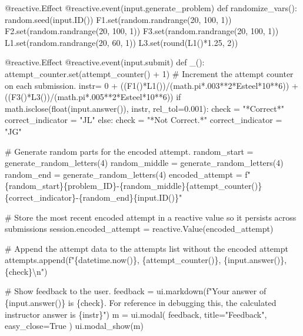 \documentclass[
  letterpaper,
  DIV=11,
  numbers=noendperiod]{scrreprt}
\newenvironment{Shaded}{\begin{snugshade}}{\end{snugshade}}
\newcommand{\NormalTok}[1]{\textcolor[rgb]{0.00,0.23,0.31}{#1}}
\begin{document}
\begin{Shaded}
\begin{Highlighting}[]
\NormalTok{    @reactive.Effect}
\NormalTok{    @reactive.event(input.generate\_problem)}
\NormalTok{    def randomize\_vars():}
\NormalTok{        random.seed(input.ID())}
\NormalTok{        F1.set(random.randrange(20, 100, 1))}
\NormalTok{        F2.set(random.randrange(20, 100, 1))}
\NormalTok{        F3.set(random.randrange(20, 100, 1))}
\NormalTok{        L1.set(random.randrange(20, 60, 1))}
\NormalTok{        L3.set(round(L1()*1.25, 2))}
        
        

\NormalTok{    @reactive.Effect}
\NormalTok{    @reactive.event(input.submit)}
\NormalTok{    def \_():}
\NormalTok{        attempt\_counter.set(attempt\_counter() + 1)  \# Increment the attempt counter on each submission.}
\NormalTok{        instr= 0 + ((F1()*L1())/(math.pi*.003**2*Esteel*10**6)) + ((F3()*L3())/(math.pi*.005**2*Esteel*10**6))}
\NormalTok{        if math.isclose(float(input.answer()), instr, rel\_tol=0.001):}
\NormalTok{            check = "*Correct*"}
\NormalTok{            correct\_indicator = "JL"}
\NormalTok{        else:}
\NormalTok{            check = "*Not Correct.*"}
\NormalTok{            correct\_indicator = "JG"}

\NormalTok{        \# Generate random parts for the encoded attempt.}
\NormalTok{        random\_start = generate\_random\_letters(4)}
\NormalTok{        random\_middle = generate\_random\_letters(4)}
\NormalTok{        random\_end = generate\_random\_letters(4)}
\NormalTok{        encoded\_attempt = f"\{random\_start\}\{problem\_ID\}{-}\{random\_middle\}\{attempt\_counter()\}\{correct\_indicator\}{-}\{random\_end\}\{input.ID()\}"}

\NormalTok{        \# Store the most recent encoded attempt in a reactive value so it persists across submissions}
\NormalTok{        session.encoded\_attempt = reactive.Value(encoded\_attempt)}

\NormalTok{        \# Append the attempt data to the attempts list without the encoded attempt}
\NormalTok{        attempts.append(f"\{datetime.now()\}, \{attempt\_counter()\}, \{input.answer()\}, \{check\}\textbackslash{}n")}

\NormalTok{        \# Show feedback to the user.}
\NormalTok{        feedback = ui.markdown(f"Your answer of \{input.answer()\} is \{check\}. For reference in debugging this, the calculated instructor answer is \{instr\}")}
\NormalTok{        m = ui.modal(}
\NormalTok{            feedback,}
\NormalTok{            title="Feedback",}
\NormalTok{            easy\_close=True}
\NormalTok{        )}
\NormalTok{        ui.modal\_show(m)}


\end{Highlighting}
\end{Shaded}
\end{document}
